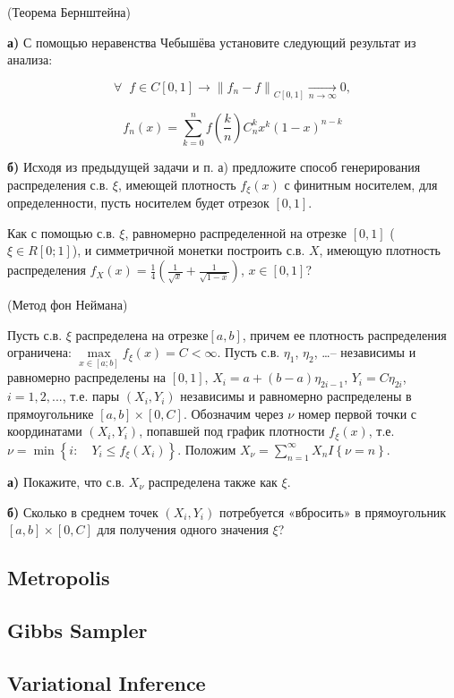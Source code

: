 \begin{problem}
(Теорема Бернштейна) 

\textbf{а)} С помощью неравенства Чебышёва установите следующий результат из анализа: 

\[
\forall \; \; f\in C\left[0,1\right]\to \left\| f_{n} -f\right\| _{C\left[0,1\right]} \xrightarrow[{n\to \infty }]{} 0,
\] 

\[
f_{n} \left(x\right)=\sum_{k=0}^{n}f\left(\frac{k}{n} \right) C_{n}^{k} x^{k} \left(1-x\right)^{n-k} 
\]

\textbf{б)} Исходя из предыдущей задачи и п. а) предложите способ генерирования распределения с.в. $\xi $, имеющей плотность $f_{\xi } \left(x\right)$ с финитным носителем, для определенности, пусть носителем будет отрезок $\left[0,1\right]$.
\end{problem}

\begin{problem}
Как с помощью с.в. $\xi $, равномерно распределенной на отрезке $\left[0,1\right]$ ($\xi \in R\left[0;1\right]$), и симметричной монетки построить с.в. $X$, имеющую плотность распределения $f_{X} (x)=\frac{1}{4} \left(\frac{1}{\sqrt{x} } +\frac{1}{\sqrt{1-x} } \right)$, $x\in \left[0,1\right]$?
\end{problem}

\begin{problem}
(Метод фон Неймана) 

Пусть с.в. $\xi $ распределена на отрезке$\left[a,b\right]$, причем ее плотность распределения ограничена: $\mathop{\max }\limits_{x\in \left[a;b\right]} f_{\xi } (x)=C<\infty $. Пусть с.в. $\eta _{1} $, $\eta _{2} $, \dots  -- независимы и равномерно распределены на $\left[0,1\right]$, $X_{i} =a+\left(b-a\right)\eta _{2i-1} $, $Y_{i} =C\eta _{2i} $, $i=1,2,...$, т.е. пары $\left(X_{i} ,Y_{i} \right)$ независимы и равномерно распределены в прямоугольнике $\left[a,b\right]\times \left[0,C\right]$. Обозначим через $\nu $ номер первой точки с координатами $\left(X_{i} ,Y_{i} \right)$, попавшей под график плотности $f_{\xi } (x)$, т.е. $\nu =\min \left\{i:\quad Y_{i} \le f_{\xi } (X_{i} )\right\}$. Положим $X_{\nu } =\sum _{n=1}^{\infty }X_{n} I\left\{\nu =n\right\} $.

\textbf{а)} Покажите, что с.в. $X_{\nu } $ распределена также как $\xi $.

\textbf{б)} Сколько в среднем точек $\left(X_{i} ,Y_{i} \right)$ потребуется «вбросить» в прямоугольник $\left[a,b\right]\times \left[0,C\right]$ для получения одного значения $\xi $?
\end{problem}

\subsection{Metropolis}

\subsection{Gibbs Sampler}

\subsection{Variational Inference}